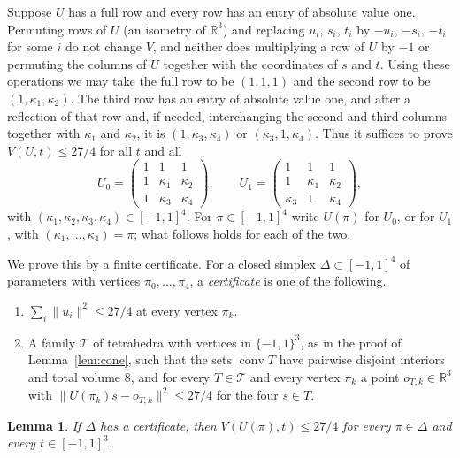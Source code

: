 \documentclass[11pt]{amsart}
\newtheorem{lem}[thm]{Lemma}
\theoremstyle{remark}
\numberwithin{equation}{section}
\DeclareMathOperator{\conv}{conv}
\begin{document}
Suppose $U$ has a full row and every row has an entry of absolute value one. Permuting rows of $U$ (an isometry of $\mathbb R^3$) and replacing $u_i$, $s_i$, $t_i$ by $-u_i$, $-s_i$, $-t_i$ for some $i$ do not change $V$, and neither does multiplying a row of $U$ by $-1$ or permuting the columns of $U$ together with the coordinates of $s$ and $t$. Using these operations we may take the full row to be $(1,1,1)$ and the second row to be $(1,\kappa_1,\kappa_2)$. The third row has an entry of absolute value one, and after a reflection of that row and, if needed, interchanging the second and third columns together with $\kappa_1$ and $\kappa_2$, it is $(1,\kappa_3,\kappa_4)$ or $(\kappa_3,1,\kappa_4)$. Thus it suffices to prove $V(U,t)\le27/4$ for all $t$ and all
\begin{equation}\label{eq:boxes}
U_0=\begin{pmatrix}1&1&1\\1&\kappa_1&\kappa_2\\1&\kappa_3&\kappa_4\end{pmatrix},\qquad U_1=\begin{pmatrix}1&1&1\\1&\kappa_1&\kappa_2\\\kappa_3&1&\kappa_4\end{pmatrix},
\end{equation}
with $(\kappa_1,\kappa_2,\kappa_3,\kappa_4)\in[-1,1]^4$. For $\pi\in[-1,1]^4$ write $U(\pi)$ for $U_0$, or for $U_1$, with $(\kappa_1,\dots,\kappa_4)=\pi$; what follows holds for each of the two.

We prove this by a finite certificate. For a closed simplex $\Delta\subset[-1,1]^4$ of parameters with vertices $\pi_0,\dots,\pi_4$, a \emph{certificate} is one of the following.
\begin{enumerate}
\item[(I)] $\sum_i\|u_i\|^2\le27/4$ at every vertex $\pi_k$.
\item[(C)] A family $\mathcal T$ of tetrahedra with vertices in $\{-1,1\}^3$, as in the proof of Lemma~\ref{lem:cone}, such that the sets $\conv T$ have pairwise disjoint interiors and total volume $8$, and for every $T\in\mathcal T$ and every vertex $\pi_k$ a point $o_{T,k}\in\mathbb R^3$ with $\|U(\pi_k)s-o_{T,k}\|^2\le27/4$ for the four $s\in T$.
\end{enumerate}

\begin{lem}\label{lem:cert}
If $\Delta$ has a certificate, then $V(U(\pi),t)\le27/4$ for every $\pi\in\Delta$ and every $t\in[-1,1]^3$.
\end{lem}
\end{document}
